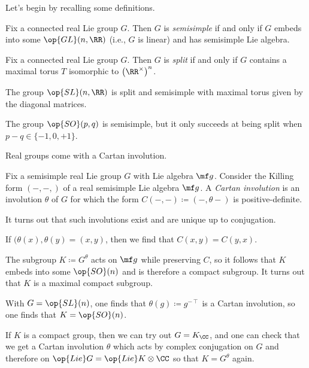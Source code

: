 \documentclass[../notes.tex]{subfiles}
\begin{document}
Let's begin by recalling some definitions.
\begin{definition}[semisimple]
	Fix a connected real Lie group $G$. Then $G$ is \textit{semisimple} if and only if $G$ embeds into some $\op{GL}(n,\RR)$ (i.e., $G$ is linear) and has semisimple Lie algebra.
\end{definition}
\begin{definition}[split]
	Fix a connected real Lie group $G$. Then $G$ is \textit{split} if and only if $G$ contains a maximal torus $T$ isomorphic to $\left(\RR^\times\right)^n$.
\end{definition}
\begin{example}
	The group $\op{SL}(n,\RR)$ is split and semisimple with maximal torus given by the diagonal matrices.
\end{example}
\begin{example}
	The group $\op{SO}(p,q)$ is semisimple, but it only succeeds at being split when $p-q\in\{-1,0,+1\}$.
\end{example}
Real groups come with a Cartan involution.
\begin{definition}
	Fix a semisimple real Lie group $G$ with Lie algebra $\mf g$. Consider the Killing form $(-,-,)$ of a real semisimple Lie algebra $\mf g$. A \textit{Cartan involution} is an involution $\theta$ of $G$ for which the form $C(-,-)\coloneqq(-,\theta-)$ is positive-definite.
\end{definition}
\begin{remark}
	It turns out that such involutions exist and are unique up to conjugation.
\end{remark}
\begin{remark}
	If $(\theta(x),\theta(y)=(x,y)$, then we find that $C(x,y)=C(y,x)$.
\end{remark}
\begin{remark} \label{rem:cartan-to-compact}
	The subgroup $K\coloneqq G^\theta$ acts on $\mf g$ while preserving $C$, so it follows that $K$ embeds into some $\op{SO}(n)$ and is therefore a compact subgroup. It turns out that $K$ is a maximal compact subgroup.
\end{remark}
\begin{example}
	With $G=\op{SL}(n)$, one finds that $\theta(g)\coloneqq g^{-\intercal}$ is a Cartan involution, so one finds that $K=\op{SO}(n)$.
\end{example}
\begin{example}
	If $K$ is a compact group, then we can try out $G=K_\CC$, and one can check that we get a Cartan involution $\theta$ which acts by complex conjugation on $G$ and therefore on $\op{Lie}G=\op{Lie}K\otimes\CC$ so that $K=G^\theta$ again.
\end{example}
\end{document}
